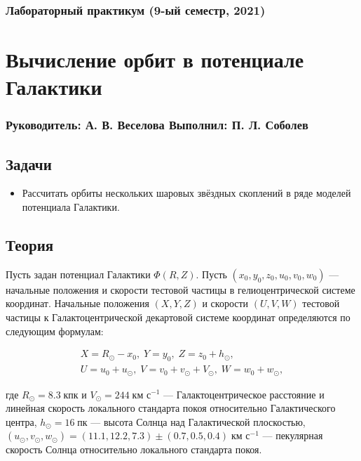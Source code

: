 \documentclass[a4paper, oneside]{article}
\newcommand{\su}{\vspace{-0.5em}}
\newcommand{\npar}{\par\vspace{\baselineskip}}
\begin{document}
\subsubsection*{Лабораторный практикум (9-ый семестр, 2021)}
\section*{Вычисление орбит в потенциале Галактики}
\subsubsection*{Руководитель: А. В. Веселова \hspace{2em} Выполнил: П. Л. Соболев}

\vspace{3em}

\subsection*{Задачи}

\begin{itemize}
  \setlength\itemsep{-0.1em}
  \item Рассчитать орбиты нескольких шаровых звёздных скоплений в ряде моделей потенциала Галактики.
\end{itemize}

\subsection*{Теория}

Пусть задан потенциал Галактики $ \Phi(R, Z) $. Пусть $ (x_0, y_0, z_0, u_0, v_0, w_0) $ --- начальные положения и скорости тестовой частицы в гелиоцентрической системе координат. Начальные положения $ (X, Y, Z) $ и скорости $ (U, V, W) $ тестовой частицы к Галактоцентрической декартовой системе координат определяются по следующим формулам:

\su
\begin{equation}
\begin{gathered}
  X = R_\odot - x_0, \; Y = y_0, \; Z = z_0 + h_\odot, \\
  U = u_0 + u_\odot, \; V = v_0 + v_\odot + V_\odot, \; W = w_0 + w_\odot,
\end{gathered}
\end{equation}

где $ R_\odot = 8.3 \; \text{кпк} $ и $ V_\odot = 244 \; \text{км с}^{-1} $ --- Галактоцентрическое расстояние и линейная скорость локального стандарта покоя относительно Галактического центра, $ h_\odot = 16 \; \text{пк} $ --- высота Солнца над Галактической плоскостью, $ (u_\odot, v_\odot, w_\odot) = (11.1, 12.2, 7.3) \pm (0.7, 0.5, 0.4) \; \text{км с}^{-1} $ --- пекулярная скорость Солнца относительно локального стандарта покоя. \npar
\end{document}
